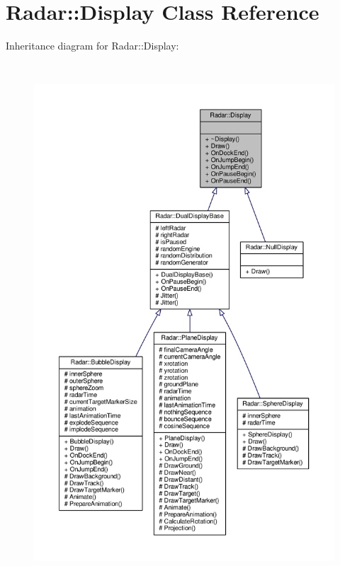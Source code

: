 \hypertarget{classRadar_1_1Display}{}\section{Radar\+:\+:Display Class Reference}
\label{classRadar_1_1Display}


Inheritance diagram for Radar\+:\+:Display\+:
\nopagebreak
\begin{figure}[H]
\begin{center}
\leavevmode
\includegraphics[height=550pt]{d2/db1/classRadar_1_1Display__inherit__graph}
\end{center}
\end{figure}


